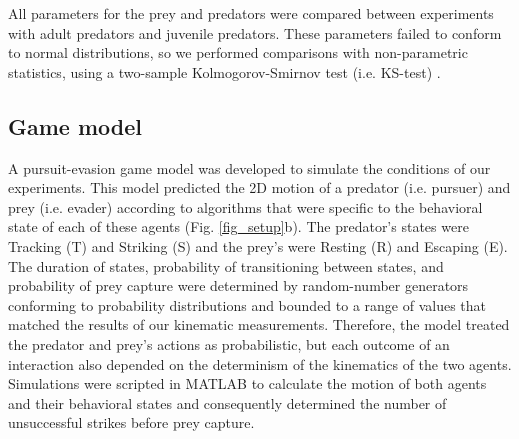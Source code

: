 \documentclass[]{rsos}%
\begin{document}
All parameters for the prey and predators were compared between experiments with adult predators and juvenile predators.
These parameters failed to conform to normal distributions, so we performed comparisons with non-parametric statistics, using a two-sample Kolmogorov-Smirnov test (i.e. KS-test) \cite{MasseyJr:1951jo}. 

\subsection{Game model}
A pursuit-evasion game model was developed to simulate the conditions of our experiments. 
This model predicted the 2D motion of a predator (i.e. pursuer) and prey (i.e. evader) according to algorithms that were specific to the behavioral state of each of these agents (Fig. \ref{fig_setup}b). 
The predator's states were Tracking (T) and Striking (S) and the prey's were Resting (R) and Escaping (E). 
The duration of states, probability of transitioning between states, and probability of prey capture were determined by random-number generators conforming to probability distributions and bounded to a range of values that matched the results of our kinematic measurements.
Therefore, the model treated the predator and prey's actions as probabilistic, but each outcome of an interaction also depended on the determinism of the kinematics of the two agents.
Simulations were scripted in MATLAB to calculate the motion of both agents and their behavioral states and consequently determined the number of unsuccessful strikes before prey capture.
\end{document}
